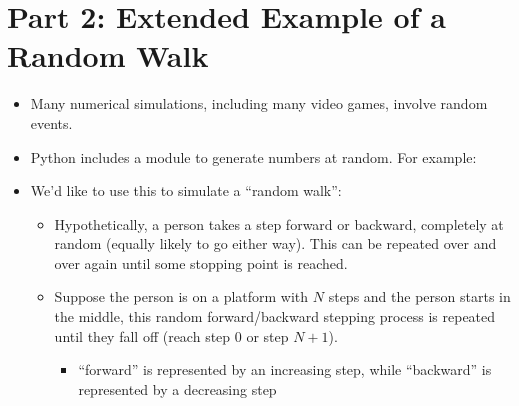 \documentclass[letterpaper,10pt,english]{sphinxmanual}
\begin{document}
\section{Part 2:  Extended Example of a Random Walk}
\label{\detokenize{lecture_notes/lec11_conditionals2:part-2-extended-example-of-a-random-walk}}\begin{itemize}
\item {} 
Many numerical simulations, including many video games, involve random
events.

\item {} 
Python includes a module to generate numbers at random. For
example:

\begin{sphinxVerbatim}[commandchars=\\\{\}]
 


 
 
 
\end{sphinxVerbatim}

\item {} 
We’d like to use this to simulate a “random walk”:
\begin{itemize}
\item {} 
Hypothetically, a person takes a step forward or backward,
completely at random (equally likely to go either way). This
can be repeated over and over again until some stopping point is
reached.

\item {} 
Suppose the person is on a platform with \(N\) steps and the person
starts in the middle, this random forward/backward stepping
process is repeated until they fall off (reach step 0 or step
\(N+1\)).
\begin{itemize}
\item {} 
“forward” is represented by an increasing step, while
“backward” is represented by a decreasing step


\end{itemize}
\end{itemize}
\end{itemize}
\end{document}
